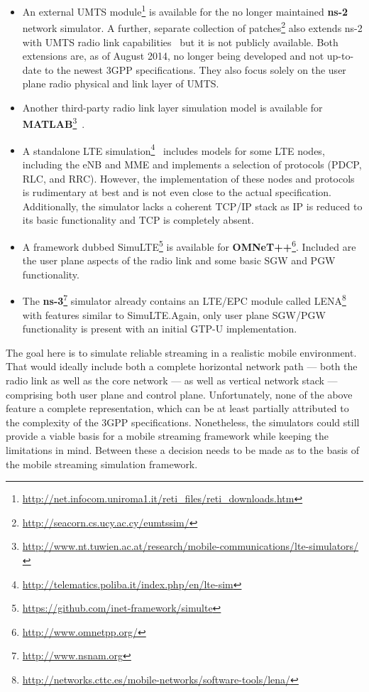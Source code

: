 \begin{itemize}
	\item An external \gls{UMTS} module\footnote{\url{http://net.infocom.uniroma1.it/reti_files/reti_downloads.htm}} is available for the no longer maintained \textbf{ns-2} network simulator. A further, separate collection of patches\footnote{\url{http://seacorn.cs.ucy.ac.cy/eumtssim/}} also extends ns-2 with \gls{UMTS} radio link capabilities~\cite{vranjevs2011use} but it is not publicly available. Both extensions are, as of August 2014, no longer being developed and not up-to-date to the newest \gls{3GPP} specifications. They also focus solely on the user plane radio physical and link layer of \gls{UMTS}.

	\item Another third-party radio link layer simulation model is available for \textbf{MATLAB}\footnote{\url{http://www.nt.tuwien.ac.at/research/mobile-communications/lte-simulators/}}~\cite{mehlfuhrer2011vienna}.

	\item A standalone \gls{LTE} simulation\footnote{\url{http://telematics.poliba.it/index.php/en/lte-sim}}~\cite{5634134} includes models for some \gls{LTE} nodes, including the \gls{eNB} and \gls{MME} and implements a selection of protocols (\gls{PDCP}, \gls{RLC}, and \gls{RRC}). However, the implementation of these nodes and protocols is rudimentary at best and is not even close to the actual specification. Additionally, the simulator lacks a coherent \gls{TCP}/\gls{IP} stack as \gls{IP} is reduced to its basic functionality and \gls{TCP} is completely absent.

	\item A framework dubbed SimuLTE\footnote{\url{https://github.com/inet-framework/simulte}} is available for \textbf{OMNeT++}\footnote{\url{http://www.omnetpp.org/}}. Included are the user plane aspects of the radio link and some basic \gls{SGW} and \gls{PGW} functionality.

	\item The \textbf{ns-3}\footnote{\url{http://www.nsnam.org}} simulator already contains an \gls{LTE}/\gls{EPC} module called LENA\footnote{\url{http://networks.cttc.es/mobile-networks/software-tools/lena/}}~\cite{Baldo:2013:OSM:2507924.2507940} with features similar to SimuLTE.\@ Again, only user plane \gls{SGW}/\gls{PGW} functionality is present with an initial \gls{GTP-U} implementation.
\end{itemize}

The goal here is to simulate reliable streaming in a realistic mobile environment. That would ideally include both a complete horizontal network path --- both the radio link as well as the core network --- as well as vertical network stack --- comprising both user plane and control plane. Unfortunately, none of the above feature a complete representation, which can be at least partially attributed to the complexity of the \gls{3GPP} specifications. Nonetheless, the simulators could still provide a viable basis for a mobile streaming framework while keeping the limitations in mind. Between these a decision needs to be made as to the basis of the mobile streaming simulation framework. 

